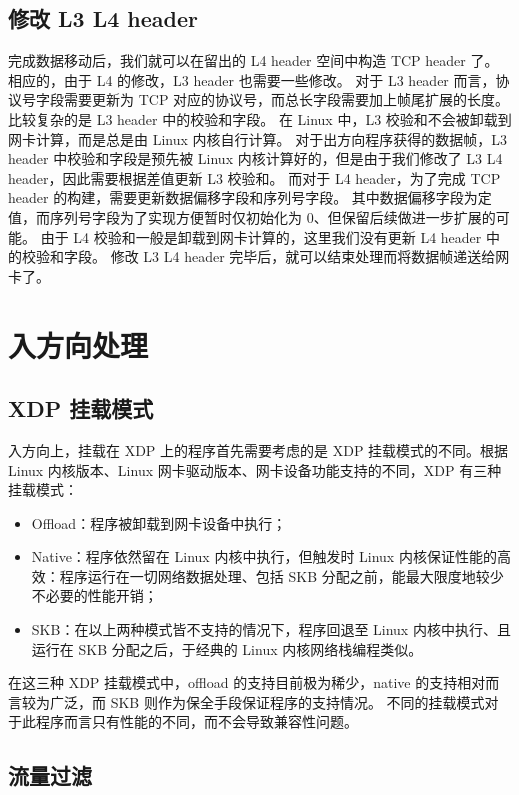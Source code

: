 \subsection{修改 L3 L4 header}

完成数据移动后，我们就可以在留出的 L4 header 空间中构造 TCP header 了。
相应的，由于 L4 的修改，L3 header 也需要一些修改。
对于 L3 header 而言，协议号字段需要更新为 TCP 对应的协议号，而总长字段需要加上帧尾扩展的长度。
比较复杂的是 L3 header 中的校验和字段。
在 Linux 中，L3 校验和不会被卸载到网卡计算，而是总是由 Linux 内核自行计算。
对于出方向程序获得的数据帧，L3 header 中校验和字段是预先被 Linux 内核计算好的，但是由于我们修改了 L3 L4 header，因此需要根据差值更新 L3 校验和。
而对于 L4 header，为了完成 TCP header 的构建，需要更新数据偏移字段和序列号字段。
其中数据偏移字段为定值，而序列号字段为了实现方便暂时仅初始化为 0、但保留后续做进一步扩展的可能。
由于 L4 校验和一般是卸载到网卡计算的，这里我们没有更新 L4 header 中的校验和字段。
修改 L3 L4 header 完毕后，就可以结束处理而将数据帧递送给网卡了。

\section{入方向处理}

\subsection{XDP 挂载模式}

入方向上，挂载在 XDP 上的程序首先需要考虑的是 XDP 挂载模式的不同。根据 Linux 内核版本、Linux 网卡驱动版本、网卡设备功能支持的不同，XDP 有三种挂载模式：

\begin{itemize}
  \item Offload：程序被卸载到网卡设备中执行；
  \item Native：程序依然留在 Linux 内核中执行，但触发时 Linux 内核保证性能的高效：程序运行在一切网络数据处理、包括 SKB 分配之前，能最大限度地较少不必要的性能开销；
  \item SKB：在以上两种模式皆不支持的情况下，程序回退至 Linux 内核中执行、且运行在 SKB 分配之后，于经典的 Linux 内核网络栈编程类似。
\end{itemize}

在这三种 XDP 挂载模式中，offload 的支持目前极为稀少，native 的支持相对而言较为广泛，而 SKB 则作为保全手段保证程序的支持情况。
不同的挂载模式对于此程序而言只有性能的不同，而不会导致兼容性问题。

\subsection{流量过滤}

